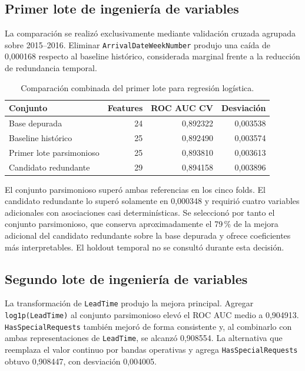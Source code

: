 \subsection{Primer lote de ingeniería de variables}

La comparación se realizó exclusivamente mediante validación cruzada agrupada
sobre 2015--2016. Eliminar \texttt{ArrivalDateWeekNumber} produjo una caída de
0,000168 respecto al baseline histórico, considerada marginal frente a la
reducción de redundancia temporal.

\begin{table}[htbp]
    \centering
    \caption{Comparación combinada del primer lote para regresión logística.}
    \label{tab:first-feature-batch}
    \begin{tabular}{lrrr}
        \toprule
        Conjunto & Features & ROC AUC CV & Desviación \\
        \midrule
        Base depurada & 24 & 0,892322 & 0,003538 \\
        Baseline histórico & 25 & 0,892490 & 0,003574 \\
        Primer lote parsimonioso & 25 & 0,893810 & 0,003613 \\
        Candidato redundante & 29 & 0,894158 & 0,003896 \\
        \bottomrule
    \end{tabular}
\end{table}

El conjunto parsimonioso superó ambas referencias en los cinco folds. El
candidato redundante lo superó solamente en 0,000348 y requirió cuatro
variables adicionales con asociaciones casi determinísticas. Se seleccionó
por tanto el conjunto parsimonioso, que conserva aproximadamente el 79\,\% de
la mejora adicional del candidato redundante sobre la base depurada y ofrece
coeficientes más interpretables. El holdout temporal no se consultó durante
esta decisión.

\subsection{Segundo lote de ingeniería de variables}

La transformación de \texttt{LeadTime} produjo la mejora principal. Agregar
\texttt{log1p(LeadTime)} al conjunto parsimonioso elevó el ROC AUC medio a
0,904913. \texttt{HasSpecialRequests} también mejoró de forma consistente y,
al combinarlo con ambas representaciones de \texttt{LeadTime}, se alcanzó
0,908554. La alternativa que reemplaza el valor continuo por bandas operativas
y agrega \texttt{HasSpecialRequests} obtuvo 0,908447, con desviación 0,004005.

